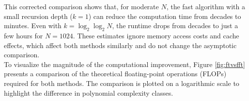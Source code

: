 \documentclass[11pt]{article}
\theoremstyle{definition}
\theoremstyle{remark}
\numberwithin{equation}{section}
\begin{document}
This corrected comparison shows that, for moderate $N$, the fast algorithm with a small recursion depth ($k=1$) can reduce the computation time from decades to minutes. Even with $k=\log_2 \log_2 N$, the runtime drops from decades to just a few hours for $
N=1024$. These estimates ignore memory access costs and cache effects, which affect both methods similarly and do not change the asymptotic comparison.\\



To visualize the magnitude of the computational improvement, Figure \ref{fig:ftvsfft} presents a comparison of the theoretical floating-point operations (FLOPs) required for both methods. The comparison is plotted on a logarithmic scale to highlight the difference in polynomial complexity classes.
\end{document}
